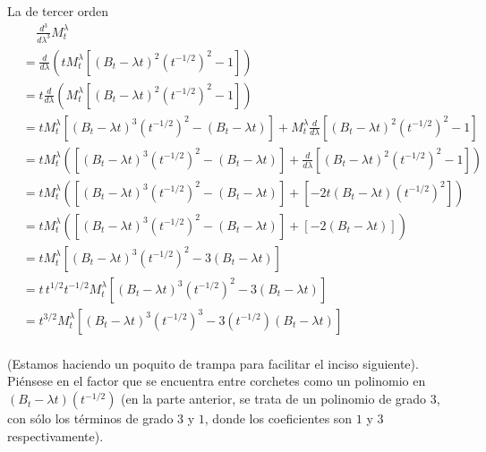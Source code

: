 La de tercer orden
\begin{align}
    &   \;\;\;\;\frac{d^3}{d\lambda^3}  M_t^\lambda                                                                                                                                                         \\
    &=  \frac{d}{d\lambda} \left(t M_t^\lambda  \left[ (B_t - \lambda t)^2 (t^{-1/2})^2 -  1 \right] \right)                                                                                                \\ 
    &=  t \frac{d}{d\lambda} \left( M_t^\lambda  \left[ (B_t - \lambda t)^2 (t^{-1/2})^2 -  1 \right] \right)                                                                                               \\
    &=  t   M_t^\lambda \left[ (B_t - \lambda t)^3 (t^{-1/2})^2 -  (B_t - \lambda t) \right]    +   M_t^\lambda \frac{d}{d\lambda} \left[ (B_t - \lambda t)^2 (t^{-1/2})^2 -  1 \right]                  \\
    &=  t   M_t^\lambda \left(\left[ (B_t - \lambda t)^3 (t^{-1/2})^2 -  (B_t - \lambda t) \right]  +  \frac{d}{d\lambda} \left[ (B_t - \lambda t)^2 (t^{-1/2})^2 -  1 \right]\right)                  \\
    &=  t   M_t^\lambda \left(\left[ (B_t - \lambda t)^3 (t^{-1/2})^2 -  (B_t - \lambda t) \right]  +  \left[ -2t(B_t - \lambda t) (t^{-1/2})^2 \right]\right)                  \\
    &=  t   M_t^\lambda \left(\left[ (B_t - \lambda t)^3 (t^{-1/2})^2 -  (B_t - \lambda t) \right]  +  \left[ -2(B_t - \lambda t) \right]\right)                  \\
    &=  t   M_t^\lambda \left[ (B_t - \lambda t)^3 (t^{-1/2})^2 -  3(B_t - \lambda t) \right]                    \\
    &=  t \, t^{1/2} t^{-1/2}  M_t^\lambda \left[ (B_t - \lambda t)^3 (t^{-1/2})^2 -  3(B_t - \lambda t) \right]                   \\
    &=  t^{3/2}   M_t^\lambda \left[ (B_t - \lambda t)^3 (t^{-1/2})^3 -  3 (t^{-1/2})(B_t - \lambda t) \right]                    \\
\end{align}\pn

(Estamos haciendo un poquito de trampa para facilitar el inciso siguiente). Piénsese en el factor 
que se encuentra entre corchetes como un polinomio en $(B_t - \lambda t) (t^{-1/2})$ (en la parte 
anterior, se trata de un polinomio de grado $3$, con sólo los términos de grado $3$ y $1$, donde 
los coeficientes son $1$ y $3$ respectivamente).\pn


